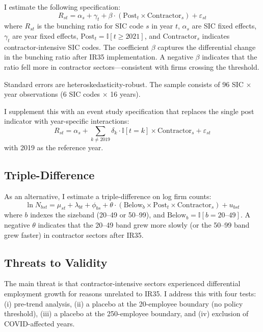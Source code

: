 \documentclass[12pt]{article}
\newcommand{\ind}{\mathbb{I}}
\begin{document}
I estimate the following specification:
\begin{equation}
R_{st} = \alpha_s + \gamma_t + \beta \cdot (\text{Post}_{t} \times \text{Contractor}_{s}) + \varepsilon_{st}
\label{eq:main}
\end{equation}
where $R_{st}$ is the bunching ratio for SIC code $s$ in year $t$, $\alpha_s$ are SIC fixed effects, $\gamma_t$ are year fixed effects, $\text{Post}_{t} = \ind[t \geq 2021]$, and $\text{Contractor}_{s}$ indicates contractor-intensive SIC codes. The coefficient $\beta$ captures the differential change in the bunching ratio after IR35 implementation. A negative $\beta$ indicates that the ratio fell more in contractor sectors---consistent with firms crossing the threshold.

Standard errors are heteroskedasticity-robust. The sample consists of 96 SIC $\times$ year observations (6 SIC codes $\times$ 16 years).

I supplement this with an event study specification that replaces the single post indicator with year-specific interactions:
\begin{equation}
R_{st} = \alpha_s + \sum_{k \neq 2019} \delta_k \cdot \ind[t = k] \times \text{Contractor}_{s} + \varepsilon_{st}
\label{eq:event}
\end{equation}
with 2019 as the reference year.

\subsection{Triple-Difference}

As an alternative, I estimate a triple-difference on log firm counts:
\begin{equation}
\ln N_{bst} = \mu_{st} + \lambda_{bt} + \phi_{bs} + \theta \cdot (\text{Below}_{b} \times \text{Post}_{t} \times \text{Contractor}_{s}) + u_{bst}
\label{eq:ddd}
\end{equation}
where $b$ indexes the sizeband (20--49 or 50--99), and $\text{Below}_{b} = \ind[b = \text{20--49}]$. A negative $\theta$ indicates that the 20--49 band grew more slowly (or the 50--99 band grew faster) in contractor sectors after IR35.

\subsection{Threats to Validity}

The main threat is that contractor-intensive sectors experienced differential employment growth for reasons unrelated to IR35. I address this with four tests: (i) pre-trend analysis, (ii) a placebo at the 20-employee boundary (no policy threshold), (iii) a placebo at the 250-employee boundary, and (iv) exclusion of COVID-affected years.
\end{document}
